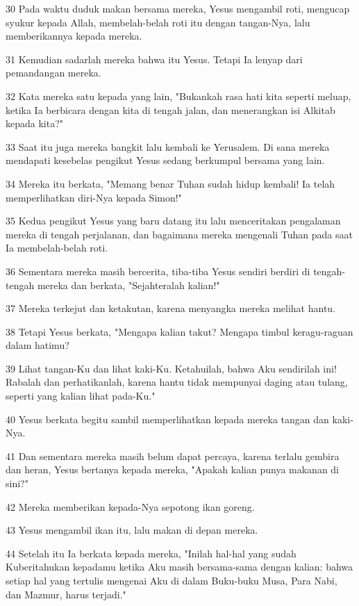 \par 30 Pada waktu duduk makan bersama mereka, Yesus mengambil roti, mengucap syukur kepada Allah, membelah-belah roti itu dengan tangan-Nya, lalu memberikannya kepada mereka.
\par 31 Kemudian sadarlah mereka bahwa itu Yesus. Tetapi Ia lenyap dari pemandangan mereka.
\par 32 Kata mereka satu kepada yang lain, "Bukankah rasa hati kita seperti meluap, ketika Ia berbicara dengan kita di tengah jalan, dan menerangkan isi Alkitab kepada kita?"
\par 33 Saat itu juga mereka bangkit lalu kembali ke Yerusalem. Di sana mereka mendapati kesebelas pengikut Yesus sedang berkumpul bersama yang lain.
\par 34 Mereka itu berkata, "Memang benar Tuhan sudah hidup kembali! Ia telah memperlihatkan diri-Nya kepada Simon!"
\par 35 Kedua pengikut Yesus yang baru datang itu lalu menceritakan pengalaman mereka di tengah perjalanan, dan bagaimana mereka mengenali Tuhan pada saat Ia membelah-belah roti.
\par 36 Sementara mereka masih bercerita, tiba-tiba Yesus sendiri berdiri di tengah-tengah mereka dan berkata, "Sejahteralah kalian!"
\par 37 Mereka terkejut dan ketakutan, karena menyangka mereka melihat hantu.
\par 38 Tetapi Yesus berkata, "Mengapa kalian takut? Mengapa timbul keragu-raguan dalam hatimu?
\par 39 Lihat tangan-Ku dan lihat kaki-Ku. Ketahuilah, bahwa Aku sendirilah ini! Rabalah dan perhatikanlah, karena hantu tidak mempunyai daging atau tulang, seperti yang kalian lihat pada-Ku."
\par 40 Yesus berkata begitu sambil memperlihatkan kepada mereka tangan dan kaki-Nya.
\par 41 Dan sementara mereka masih belum dapat percaya, karena terlalu gembira dan heran, Yesus bertanya kepada mereka, "Apakah kalian punya makanan di sini?"
\par 42 Mereka memberikan kepada-Nya sepotong ikan goreng.
\par 43 Yesus mengambil ikan itu, lalu makan di depan mereka.
\par 44 Setelah itu Ia berkata kepada mereka, "Inilah hal-hal yang sudah Kuberitahukan kepadamu ketika Aku masih bersama-sama dengan kalian: bahwa setiap hal yang tertulis mengenai Aku di dalam Buku-buku Musa, Para Nabi, dan Mazmur, harus terjadi."
